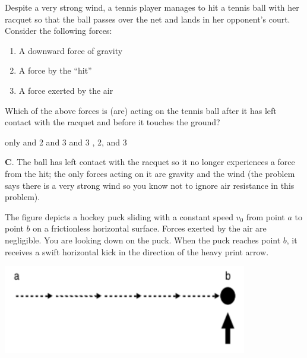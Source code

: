 \documentclass[12pt]{exam}
\begin{document}
\begin{questions}
\question
Despite a very strong wind, a tennis player manages to hit a tennis ball with her racquet so that the ball passes over the net and lands in her opponent's court. Consider the following forces:
\begin{enumerate}
\item A downward force of gravity
\item A force by the ``hit''
\item A force exerted by the air
\end{enumerate}
Which of the above forces is (are) acting on the tennis ball after it has left contact with the racquet and before it touches the ground?
\begin{choices}
 only
 and 2
 and 3
 and 3
, 2, and 3
\end{choices}
\begin{TheSolution}
\textbf{C}. The ball has left contact with the racquet so it no longer experiences a force from the hit; the only forces acting on it are gravity and the wind (the problem says there is a very strong wind so you know not to ignore air resistance in this problem).
\end{TheSolution}

\question
The figure depicts a hockey puck sliding with a constant speed $v_0$ from point $a$ to point $b$ on a frictionless horizontal surface. Forces exerted by the air are negligible. You are looking down on the puck. When the puck reaches point $b$, it receives a swift horizontal kick in the direction of the heavy print arrow.
\begin{center}
\includegraphics[width=0.8\textwidth]{../images/FCI_puck1.png}
\end{center}
\end{questions}
\end{document}

